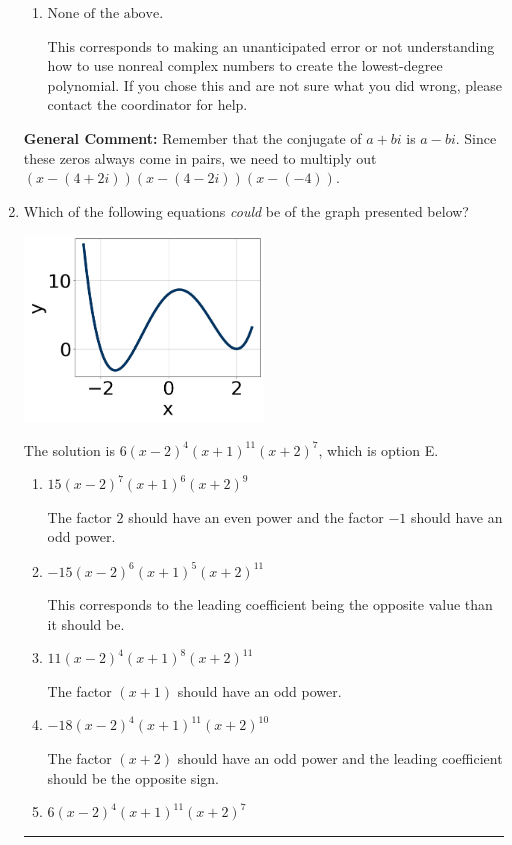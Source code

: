 \documentclass{extbook}[14pt]
\newcommand{\litem}[1]{\item #1

\rule{\textwidth}{0.4pt}}
\begin{document}
\begin{enumerate}
{\begin{enumerate}[label=\Alph*.]
$x^{3} + x^{2} -16$, which corresponds to multiplying out $(x -4)(x + 4)$.
\item \( \text{None of the above.} \)

This corresponds to making an unanticipated error or not understanding how to use nonreal complex numbers to create the lowest-degree polynomial. If you chose this and are not sure what you did wrong, please contact the coordinator for help.
\end{enumerate}

\textbf{General Comment:} Remember that the conjugate of $a+bi$ is $a-bi$. Since these zeros always come in pairs, we need to multiply out $(x-(4 + 2 i))(x-(4 - 2 i))(x-(-4))$.
}
\litem{
Which of the following equations \textit{could} be of the graph presented below?

\begin{center}
    \includegraphics[width=0.5\textwidth]{../Figures/polyGraphToFunctionCopyC.png}
\end{center}


The solution is \( 6(x - 2)^{4} (x + 1)^{11} (x + 2)^{7} \), which is option E.\begin{enumerate}[label=\Alph*.]
\item \( 15(x - 2)^{7} (x + 1)^{6} (x + 2)^{9} \)

The factor $2$ should have an even power and the factor $-1$ should have an odd power.
\item \( -15(x - 2)^{6} (x + 1)^{5} (x + 2)^{11} \)

This corresponds to the leading coefficient being the opposite value than it should be.
\item \( 11(x - 2)^{4} (x + 1)^{8} (x + 2)^{11} \)

The factor $(x + 1)$ should have an odd power.
\item \( -18(x - 2)^{4} (x + 1)^{11} (x + 2)^{10} \)

The factor $(x + 2)$ should have an odd power and the leading coefficient should be the opposite sign.
\item \( 6(x - 2)^{4} (x + 1)^{11} (x + 2)^{7} \)


\end{enumerate}}
\end{enumerate}
\end{document}
